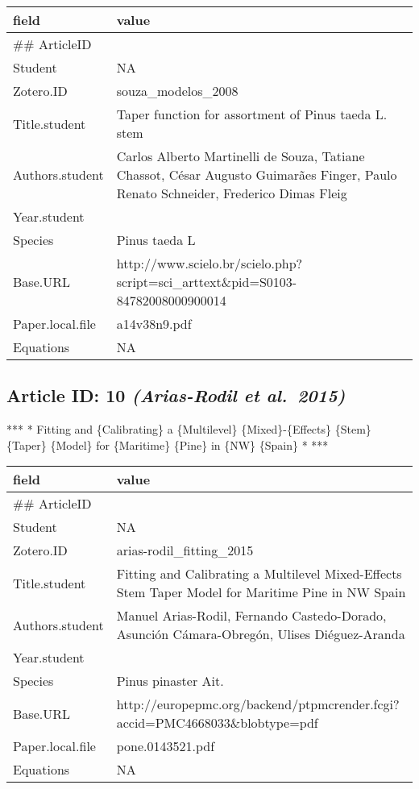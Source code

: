 \documentclass[]{article}
\begin{document}
\begin{table}[H]
\centering
\begin{tabular}{>{\raggedright\arraybackslash}p{2cm}>{\raggedright\arraybackslash}p{8cm}}
\toprule
field & value\\
\midrule
\#\# ArticleID & 9\\
Student & NA\\
Zotero.ID & souza\_modelos\_2008\\
Title.student & Taper function for assortment of Pinus taeda L. stem\\
Authors.student & Carlos Alberto Martinelli de Souza, Tatiane Chassot, César Augusto Guimarães Finger, Paulo Renato Schneider, Frederico Dimas Fleig\\
\addlinespace
Year.student & 2008\\
Species & Pinus taeda L\\
Base.URL & http://www.scielo.br/scielo.php?script=sci\_arttext\&pid=S0103-84782008000900014\\
Paper.local.file & a14v38n9.pdf\\
Equations & NA\\
\bottomrule
\end{tabular}
\end{table}

\hypertarget{article-id-10-arias-rodil-et-al.2015}{%
\subsection{\texorpdfstring{Article ID: 10 \textbf{\emph{(Arias-Rodil et
al.~2015)}}}{Article ID: 10 (Arias-Rodil et al.~2015)}}\label{article-id-10-arias-rodil-et-al.2015}}

*** * Fitting and \{Calibrating\} a \{Multilevel\} \{Mixed\}-\{Effects\}
\{Stem\} \{Taper\} \{Model\} for \{Maritime\} \{Pine\} in \{NW\}
\{Spain\} * ***

\begin{table}[H]
\centering
\begin{tabular}{>{\raggedright\arraybackslash}p{2cm}>{\raggedright\arraybackslash}p{8cm}}
\toprule
field & value\\
\midrule
\#\# ArticleID & 10\\
Student & NA\\
Zotero.ID & arias-rodil\_fitting\_2015\\
Title.student & Fitting and Calibrating a Multilevel Mixed-Effects Stem Taper Model for Maritime Pine in NW Spain\\
Authors.student & Manuel Arias-Rodil, Fernando Castedo-Dorado, Asunción Cámara-Obregón, Ulises Diéguez-Aranda\\
\addlinespace
Year.student & 2015\\
Species & Pinus pinaster Ait.\\
Base.URL & http://europepmc.org/backend/ptpmcrender.fcgi?accid=PMC4668033\&blobtype=pdf\\
Paper.local.file & pone.0143521.pdf\\
Equations & NA\\
\bottomrule
\end{tabular}
\end{table}
\end{document}
